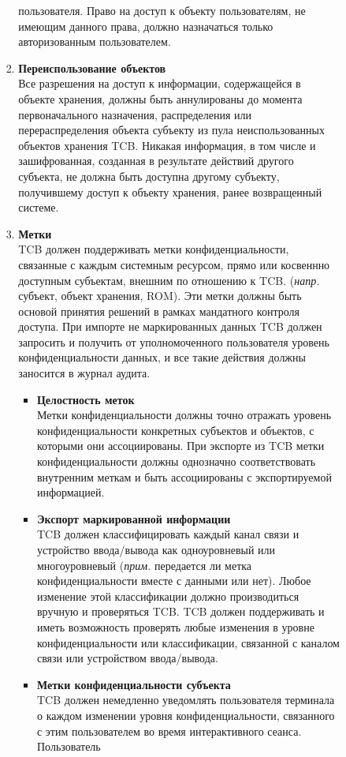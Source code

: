 \begin{enumerate}
\begin{enumerate}
\begin{enumerate}
\begin{enumerate}
				пользователя. Право на доступ к объекту пользователям, не имеющим данного права, должно назначаться только авторизованным пользователем.
				\item{\textbf{Переиспользование объектов}}\\
				Все разрешения на доступ к информации, содержащейся в объекте хранения, должны быть аннулированы до момента первоначального назначения, распределения или перераспределения объекта
				субъекту из пула неиспользованных объектов хранения TCB. Никакая информация, в том числе и зашифрованная, созданная в результате действий другого субъекта, не должна быть доступна
				другому субъекту, получившему доступ к объекту хранения, ранее возвращенный системе.
				\item{\textbf{Метки}}\\
				TCB должен поддерживать метки конфиденциальности, связанные с каждым системным ресурсом, прямо или косвеннно доступным субъектам, внешним по отношению к TCB. (\textit{напр.} субъект, 
				объект хранения, ROM). Эти метки должны быть основой принятия решений в рамках мандатного контроля доступа. При импорте не маркированных данных TCB должен запросить и получить от 
				уполномоченного пользователя уровень конфиденциальности данных, и все такие действия должны заносится в журнал аудита.
				\begin{itemize}
					\item{\textbf{Целостность меток}}\\
					Метки конфиденциальности должны точно отражать уровень конфиденциальности конкретных субъектов и объектов, с которыми они ассоциированы. При экспорте из TCB метки конфиденциальности
					должны однозначно соответствовать внутренним меткам и быть ассоциированы с экспортируемой информацией.
					\item{\textbf{Экспорт маркированной информации}}\\
					TCB должен классифицировать каждый канал связи и устройство ввода/вывода как одноуровневый или многоуровневый (\textit{прим. } передается ли метка конфиденциальности вместе с данными
					или нет). Любое изменение этой классификации должно производиться вручную и проверяться TCB. TCB должен поддерживать и иметь возможность проверять любые изменения в уровне
					конфиденциальности или классификации, связанной с каналом связи или устройством ввода/вывода.
					\item{\textbf{Метки конфиденциальности субъекта}}\\
					TCB должен немедленно уведомлять пользователя терминала о каждом изменении уровня конфиденциальности, связанного с этим пользователем во время интерактивного сеанса. Пользователь 

\end{itemize}
\end{enumerate}
\end{enumerate}
\end{enumerate}
\end{enumerate}
